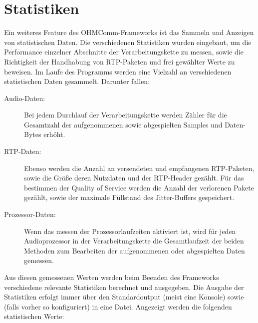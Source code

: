 \section{Statistiken}
Ein weiteres Feature des OHMComm-Frameworks ist das Sammeln und Anzeigen von statistischen Daten. Die verschiedenen Statistiken wurden eingebaut, um die Performance einzelner Abschnitte der Verarbeitungskette zu messen, sowie die Richtigkeit der Handhabung von RTP-Paketen und frei gewählter Werte zu beweisen. Im Laufe des Programms werden eine Vielzahl an verschiedenen statistischen Daten gesammelt. Darunter fallen:
\begin{description}
\item[Audio-Daten:] Bei jedem Durchlauf der Verarbeitungskette werden Zähler für die Gesamtzahl der aufgenommenen sowie abgespielten Samples und Daten-Bytes erhöht.
\item[RTP-Daten:] Ebenso werden die Anzahl an versendeten und empfangenen RTP-Paketen, sowie die Größe deren Nutzdaten und der RTP-Header gezählt. Für das bestimmen der Quality of Service werden die Anzahl der verlorenen Pakete gezählt, sowie der maximale Füllstand des Jitter-Buffers gespeichert.
\item[Prozessor-Daten:] Wenn das messen der Prozessorlaufzeiten aktiviert ist, wird für jeden Audioprozessor in der Verarbeitungskette die Gesamtlaufzeit der beiden Methoden zum Bearbeiten der aufgenommenen oder abgespielten Daten gemessen.
\end{description}
Aus diesen gemessenen Werten werden beim Beenden des Frameworks verschiedene relevante Statistiken berechnet und ausgegeben. Die Ausgabe der Statistiken erfolgt immer über den Standardoutput (meist eine Konsole) sowie (falls vorher so konfiguriert) in eine Datei. Angezeigt werden die folgenden statistischen Werte:
